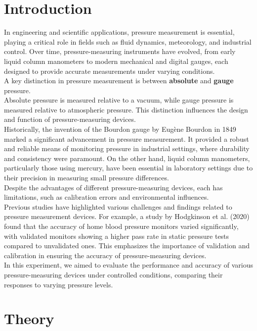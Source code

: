 \documentclass{article}
\begin{document}
	\section{Introduction}
	In engineering and scientific applications, pressure measurement is essential, playing a critical role in fields such as fluid dynamics, meteorology, and industrial control. Over time, pressure-measuring instruments have evolved, from early liquid column manometers to modern mechanical and digital gauges, each designed to provide accurate measurements under varying conditions.\\[1em]
	A key distinction in pressure measurement is between \textbf{absolute} and \textbf{gauge} pressure.\\ 
	Absolute pressure is measured relative to a vacuum, while gauge pressure is measured relative to atmospheric pressure. This distinction influences the design and function of pressure-measuring devices.\\[1em]
	Historically, the invention of the Bourdon gauge by Eugène Bourdon in 1849 marked a significant advancement in pressure measurement. It provided a robust and reliable means of monitoring pressure in industrial settings, where durability and consistency were paramount. On the other hand, liquid column manometers, particularly those using mercury, have been essential in laboratory settings due to their precision in measuring small pressure differences.\\[1em]
	Despite the advantages of different pressure-measuring devices, each has limitations, such as calibration errors and environmental influences.\\[1em]
	Previous studies have highlighted various challenges and findings related to pressure measurement devices. For example, a study by Hodgkinson et al. (2020) found that the accuracy of home blood pressure monitors varied significantly, with validated monitors showing a higher pass rate in static pressure tests compared to unvalidated ones. This emphasizes the importance of validation and calibration in ensuring the accuracy of pressure-measuring devices.\\[1em]
	In this experiment, we aimed to evaluate the performance and accuracy of various pressure-measuring devices under controlled conditions, comparing their responses to varying pressure levels.
	
	\newpage{}

	\section{Theory}
\end{document}
